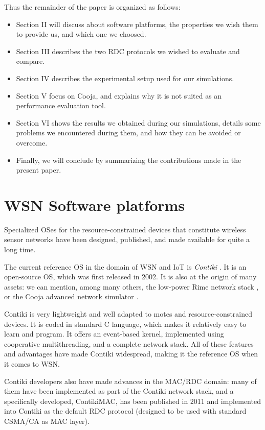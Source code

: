 \documentclass[12pt,a4paper]{article}
\begin{document}
Thus the remainder of the paper is organized as follows:
\begin{itemize}
\item Section II will discuss about software platforms, the properties
      we wish them to provide us, and which one we choosed. 
\item Section III describes the two RDC protocols we wished to evaluate and
      compare.
\item Section IV describes the experimental setup used for our simulations.
\item Section V focus on Cooja, and explains why it is not suited as an
      performance evaluation tool.
\item Section VI shows the results we obtained during our simulations,
      details some problems we encountered during them, and how they can
      be avoided or overcome.
\item Finally, we will conclude by summarizing the contributions made in
      the present paper.
\end{itemize}



\section{WSN Software platforms}

Specialized OSes for the resource-constrained devices that constitute
wireless sensor networks have been designed, published, and made available
for quite a long time.

The current reference OS in the domain of WSN and IoT is \emph{Contiki}
\cite{ContikiOS}. It is an open-source OS, which was first released
in 2002. It is also at the origin of many assets: we can mention, among
many others, the low-power Rime network stack \cite{Rime}, or the Cooja
advanced network simulator \cite{Cooja}.

Contiki is very lightweight and well adapted to motes and
resource-constrained devices. It is coded in standard C language, which
makes it relatively easy to learn and program. It offers an event-based
kernel, implemented using cooperative multithreading, and a complete
network stack. All of these features and advantages have made
Contiki widespread, making it the reference OS when it comes to WSN.

Contiki developers also have made advances in the MAC/RDC domain: many
of them have been implemented as part of the Contiki network stack, and
a specifically developed, ContikiMAC, has been published in 2011
\cite{ContikiMAC} and implemented into Contiki as the default
RDC protocol (designed to be used with standard CSMA/CA as MAC layer).
\end{document}
